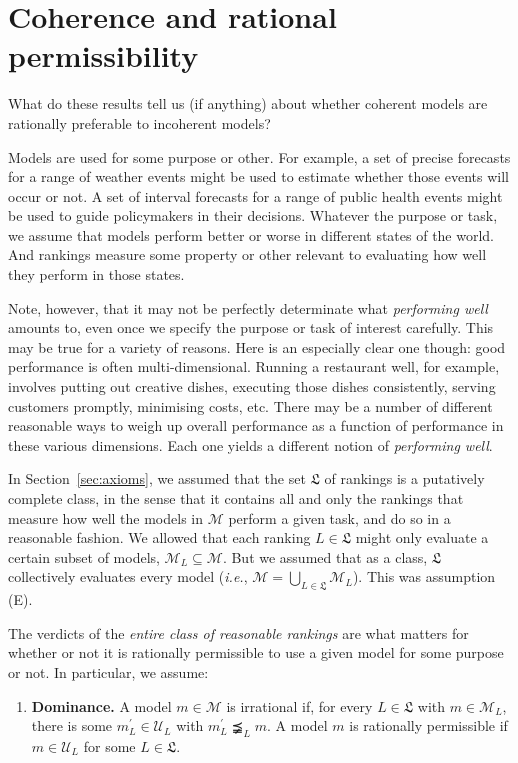 \documentclass[11pt]{article}
\theoremstyle{definition}
\theoremstyle{remark}
\newcommand{\M}{\mathcal M}
\newcommand{\U}{\mathcal U}
\begin{document}
\section{Coherence and rational permissibility}\label{sec:argument}

What do these results tell us (if anything) about whether coherent models are rationally preferable to incoherent models?

Models are used for some purpose or other. For example, a set of precise forecasts for a range of weather events might be used to estimate whether those events will occur or not. A set of interval forecasts for a range of public health events might be used to guide policymakers in their decisions. Whatever the purpose or task, we assume that models perform better or worse in different states of the world. And rankings measure some property or other relevant to evaluating how well they perform in those states.

Note, however, that it may not be perfectly determinate what \textit{performing well} amounts to, even once we specify the purpose or task of interest carefully. This may be true for a variety of reasons. Here is an especially clear one though: good performance is often multi-dimensional. Running a restaurant well, for example, involves putting out creative dishes, executing those dishes consistently, serving customers promptly, minimising costs, etc. There may be a number of different reasonable ways to weigh up overall performance as a function of performance in these various dimensions. Each one yields a different notion of \textit{performing well}.

In Section~\ref{sec:axioms}, we assumed that the set $\mathfrak L$ of rankings is a putatively complete class, in the sense that it contains all and only the rankings that measure how well the models in $\M$ perform a given task, and do so in a reasonable fashion. We allowed that each ranking $L\in\mathfrak L$ might only evaluate a certain subset of models, $\M_L\subseteq\M$. But we assumed that as a class, $\mathfrak L$ collectively evaluates every model (\textit{i.e.}, $\M=\bigcup_{L\in\mathfrak L}\M_L$). This was assumption (E).

The verdicts of the \textit{entire class of reasonable rankings} are what matters for whether or not it is rationally permissible to use a given model for some purpose or not. In particular, we assume:
\begin{enumerate}[label=\textbf{(D)},leftmargin=*]
\item \textbf{Dominance.} A model $m\in\M$ is irrational if, for every $L\in\mathfrak L$ with $m\in\M_L$, there is some $m_L^\prime\in\U_L$ with $m_L^\prime\precneqq_L m$. A model $m$ is rationally permissible if $m\in\U_L$ for some $L\in\mathfrak L$.
\end{enumerate}
\end{document}
